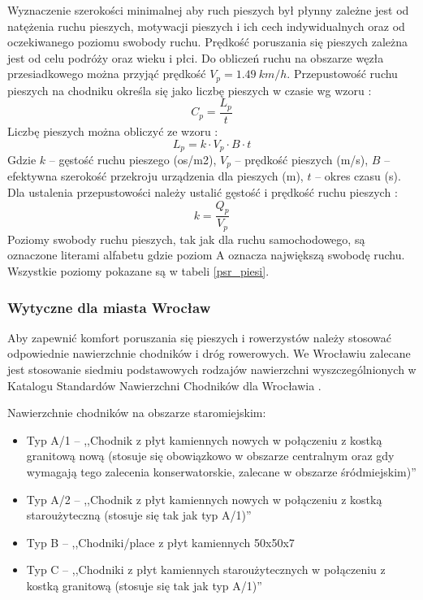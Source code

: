 \documentclass[twoside,12pt]{article}
\begin{document}
	 Wyznaczenie szerokości minimalnej aby ruch pieszych był płynny zależne jest od natężenia ruchu pieszych, motywacji pieszych i ich cech indywidualnych oraz od oczekiwanego poziomu swobody ruchu. Prędkość poruszania się pieszych zależna jest od celu podróży oraz wieku i płci. Do obliczeń ruchu na obszarze węzła przesiadkowego można przyjąć prędkość $V_p = 1.49 \ \si{km/h}$. Przepustowość ruchu pieszych na chodniku określa się jako liczbę pieszych w czasie wg wzoru \cite{standardy_wroclaw}:
	 \begin{equation}
	 C_p = \frac{L_p}{t}
	 \end{equation}
	 Liczbę pieszych można obliczyć ze wzoru \cite{standardy_wroclaw}:
	 \begin{equation}
	 L_p = k \cdot V_p \cdot B \cdot t
	 \end{equation}
	 Gdzie $k$ -- gęstość ruchu pieszego (os/m2), $V_p$ -- prędkość pieszych (m/s), $B$ -- efektywna szerokość przekroju urządzenia dla pieszych (m), $t$ -- okres czasu (s). 
	 Dla ustalenia przepustowości należy ustalić gęstość i prędkość ruchu pieszych \cite{standardy_wroclaw}:
	 \begin{equation}
	 k=\frac{Q_p}{V_p}
	 \end{equation}
	 Poziomy swobody ruchu pieszych, tak jak dla ruchu samochodowego, są oznaczone literami alfabetu gdzie poziom A oznacza największą swobodę ruchu. Wszystkie poziomy pokazane są w tabeli \ref{psr_piesi}.
	 
	 
	 \subsubsection{Wytyczne dla miasta Wrocław}
	 
	 Aby zapewnić komfort poruszania się pieszych i rowerzystów należy stosować odpowiednie nawierzchnie chodników i dróg rowerowych. We Wrocławiu zalecane jest stosowanie siedmiu podstawowych rodzajów nawierzchni wyszczególnionych w Katalogu Standardów Nawierzchni Chodników dla Wrocławia \cite{standardy_chodnik}.

\begin{samepage}
Nawierzchnie chodników na obszarze staromiejskim:
	 \begin{itemize}\setlength{\itemsep}{0em}
	 \item Typ A/1 -- ,,Chodnik z płyt kamiennych nowych w połączeniu z kostką granitową nową (stosuje się obowiązkowo w obszarze centralnym oraz gdy wymagają tego zalecenia konserwatorskie, zalecane w obszarze śródmiejskim)'' \cite{standardy_wroclaw}
	 \item Typ A/2 -- ,,Chodnik z płyt kamiennych nowych w połączeniu z kostką staroużyteczną (stosuje się tak jak typ A/1)'' \cite{standardy_wroclaw}
	 \item Typ B -- ,,Chodniki/place z płyt kamiennych 50x50x7
	 \item Typ C -- ,,Chodniki z płyt kamiennych staroużytecznych w połączeniu z kostką granitową (stosuje się tak jak typ A/1)'' \cite{standardy_wroclaw}
	 \end{itemize}\end{samepage}
	 
\end{document}
